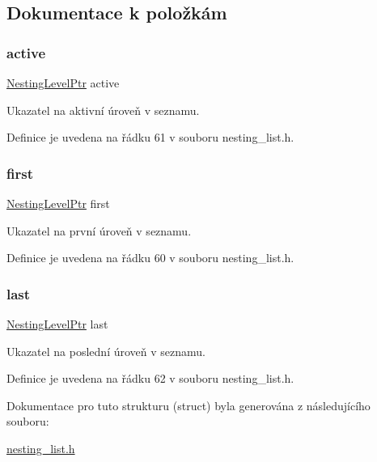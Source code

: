 \subsection{Dokumentace k položkám}
\mbox{\label{struct_s___nesting_list_a4439f6bf153d709b43d692ca94351864}} 
\subsubsection{\texorpdfstring{active}{active}}
{\footnotesize\ttfamily \hyperlink{nesting__list_8h_aea99292989d40bb6f97ba07eb2c820a6}{Nesting\+Level\+Ptr} active}



Ukazatel na aktivní úroveň v seznamu. 



Definice je uvedena na řádku 61 v souboru nesting\+\_\+list.\+h.

\mbox{\label{struct_s___nesting_list_a0dd509a2bd6569870b1c8ad52756e1d2}} 
\subsubsection{\texorpdfstring{first}{first}}
{\footnotesize\ttfamily \hyperlink{nesting__list_8h_aea99292989d40bb6f97ba07eb2c820a6}{Nesting\+Level\+Ptr} first}



Ukazatel na první úroveň v seznamu. 



Definice je uvedena na řádku 60 v souboru nesting\+\_\+list.\+h.

\mbox{\label{struct_s___nesting_list_a7de84b12b0b72abcbbc82432d18474cf}} 
\subsubsection{\texorpdfstring{last}{last}}
{\footnotesize\ttfamily \hyperlink{nesting__list_8h_aea99292989d40bb6f97ba07eb2c820a6}{Nesting\+Level\+Ptr} last}



Ukazatel na poslední úroveň v seznamu. 



Definice je uvedena na řádku 62 v souboru nesting\+\_\+list.\+h.



Dokumentace pro tuto strukturu (struct) byla generována z následujícího souboru\+:\begin{DoxyCompactItemize}
\item 
\hyperlink{nesting__list_8h}{nesting\+\_\+list.\+h}\end{DoxyCompactItemize}
